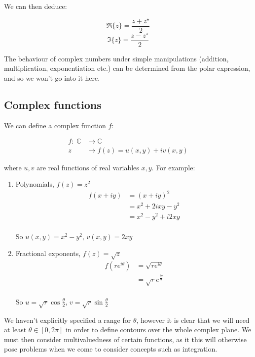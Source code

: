 \documentclass{physics_notes}
\begin{document}
We can then deduce:

\begin{equation}
\Re\{z\} = \frac{z + z^\star}{2} 
\end{equation}
\begin{equation}
\Im\{z\} = \frac{z - z^\star}{2}
\end{equation}

The behaviour of complex numbers under simple manipulations (addition, multiplication, exponentiation etc.) can be determined from the polar expression, and so we won't go into it here. 

\subsection{Complex functions}

We can define a complex function $f$:

\begin{align*}
f: \; \mathbb{C} &\rightarrow \mathbb{C} \\
z &\rightarrow f(z) = u(x, y) + iv(x, y)
\end{align*}

where $u, v$ are real functions of real variables $x, y$. For example:

\begin{enumerate}
\item{Polynomials, $f(z) = z^2$ \begin{align*} f(x + iy) &= (x + iy)^2 \\ &= x^2 + 2ixy - y^2 \\ &= x^2 - y^2 + i2xy\end{align*} \\ So $u(x, y) = x^2 - y^2, \, v(x, y) = 2xy$}
\item{Fractional exponents, $f(z) = \sqrt{z}$ \begin{align*} f(re^{i\theta}) &= \sqrt{re^{i\theta}} \\ &= \sqrt{r} e^{\frac{i\theta}{2}}\end{align*} \\ So $u = \sqrt{r}\cos{\frac{\theta}{2}}, \, v = \sqrt{r}\sin{\frac{\theta}{2}}$}
\end{enumerate}

We haven't explicitly specified a range for $\theta$, however it is clear that we will need at least $\theta \in \left[0, 2\pi\right]$ in order to define contours over the whole complex plane. We must then consider multivaluedness of certain functions, as it this will otherwise pose problems when we come to consider concepts such as integration. 
\end{document}
